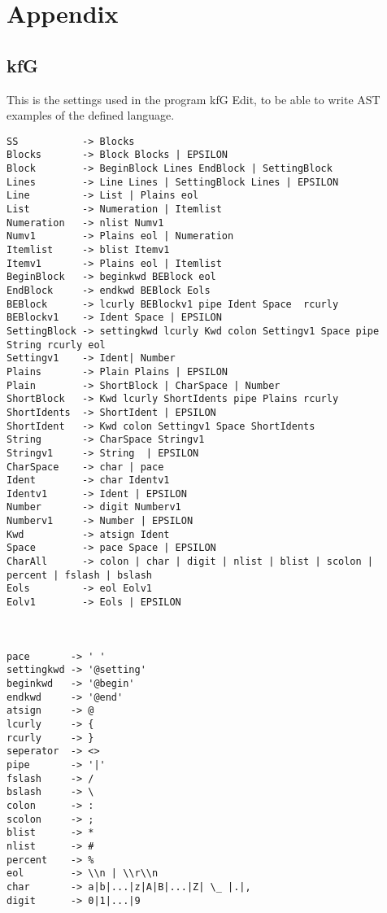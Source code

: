\chapter{Appendix}
\section{kfG}
\label{AkfG}
This is the settings used in the program kfG Edit, to be able to write AST examples of the defined language.
\begin{lstlisting}[frame=single]
SS           -> Blocks 
Blocks       -> Block Blocks | EPSILON 
Block        -> BeginBlock Lines EndBlock | SettingBlock
Lines        -> Line Lines | SettingBlock Lines | EPSILON 
Line         -> List | Plains eol
List         -> Numeration | Itemlist 
Numeration   -> nlist Numv1 
Numv1        -> Plains eol | Numeration 
Itemlist     -> blist Itemv1 
Itemv1       -> Plains eol | Itemlist 
BeginBlock   -> beginkwd BEBlock eol
EndBlock     -> endkwd BEBlock Eols
BEBlock      -> lcurly BEBlockv1 pipe Ident Space  rcurly
BEBlockv1    -> Ident Space | EPSILON
SettingBlock -> settingkwd lcurly Kwd colon Settingv1 Space pipe String rcurly eol
Settingv1    -> Ident| Number
Plains       -> Plain Plains | EPSILON
Plain        -> ShortBlock | CharSpace | Number
ShortBlock   -> Kwd lcurly ShortIdents pipe Plains rcurly
ShortIdents  -> ShortIdent | EPSILON 
ShortIdent   -> Kwd colon Settingv1 Space ShortIdents
String       -> CharSpace Stringv1
Stringv1     -> String  | EPSILON
CharSpace    -> char | pace
Ident        -> char Identv1
Identv1      -> Ident | EPSILON
Number       -> digit Numberv1
Numberv1     -> Number | EPSILON
Kwd          -> atsign Ident
Space        -> pace Space | EPSILON
CharAll      -> colon | char | digit | nlist | blist | scolon | percent | fslash | bslash
Eols         -> eol Eolv1
Eolv1        -> Eols | EPSILON



pace       -> ' ' 
settingkwd -> '@setting'
beginkwd   -> '@begin'
endkwd     -> '@end' 
atsign     -> @
lcurly     -> { 
rcurly     -> } 
seperator  -> <> 
pipe       -> '|' 
fslash     -> /
bslash     -> \
colon      -> : 
scolon     -> ; 
blist      -> * 
nlist      -> # 
percent    -> % 
eol        -> \\n | \\r\\n 
char       -> a|b|...|z|A|B|...|Z| \_ |.|,
digit      -> 0|1|...|9
\end{lstlisting}
